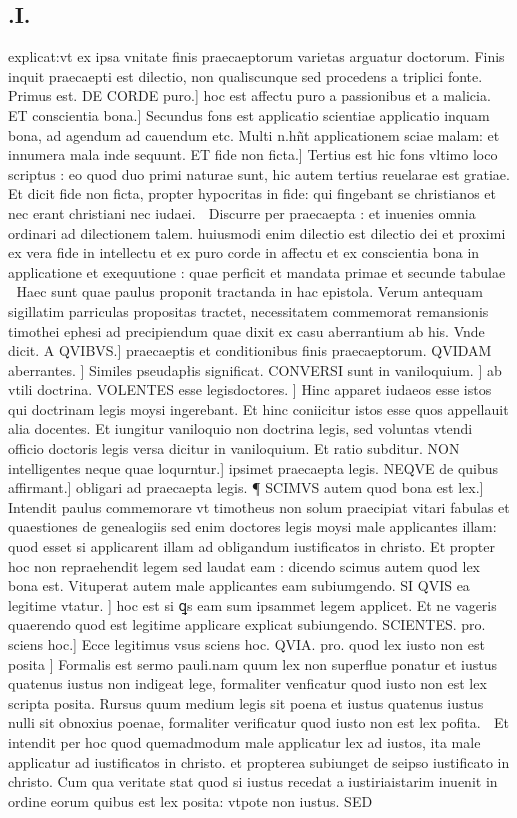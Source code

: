 \documentclass{article}
\begin{document}
\begin{pages}
\section*{.I. }\pstart explicat:vt ex ipsa vnitate finis praecaeptorum varietas arguatur doctorum. Finis inquit praecaepti est dilectio, non qualiscunque sed procedens a triplici fonte. Primus est. DE CORDE puro.] hoc est affectu puro a passionibus et a malicia. ET conscientia bona.] Secundus fons est applicatio scientiae applicatio inquam bona, ad agendum ad cauendum etc. Multi n.hñt applicationem sciae malam: et innumera mala inde sequunt. ET fide non ficta.] Tertius est hic fons vltimo loco scriptus : eo quod duo primi naturae sunt, hic autem tertius reuelarae est gratiae. Et dicit fide non ficta, propter hypocritas in fide: qui fingebant se christianos  et nec erant christiani nec iudaei.  Discurre per praecaepta : et inuenies omnia ordinari ad dilectionem talem. huiusmodi enim dilectio est dilectio dei et proximi ex vera fide in intellectu et ex puro corde in affectu et ex conscientia bona in applicatione et exequutione : quae perficit et mandata primae et secunde tabulae  Haec sunt quae paulus proponit tractanda in hac epistola. Verum antequam sigillatim parriculas propositas tractet, necessitatem commemorat remansionis timothei ephesi ad precipiendum quae dixit ex casu aberrantium ab his. Vnde dicit. A QVIBVS.] praecaeptis et conditionibus finis praecaeptorum. QVIDAM aberrantes. ] Similes pseudapłis significat. CONVERSI sunt in vaniloquium. ] ab vtili doctrina. VOLENTES esse legisdoctores. ] Hinc apparet iudaeos esse istos qui doctrinam legis moysi ingerebant. Et hinc coniicitur istos esse quos appellauit alia docentes. Et iungitur vaniloquio non doctrina legis, sed voluntas vtendi officio doctoris legis versa dicitur in vaniloquium. Et ratio subditur. NON intelligentes neque quae loqurntur.] ipsimet praecaepta legis. NEQVE de quibus affirmant.] obligari ad praecaepta legis.  \pend\pstart ¶ SCIMVS autem quod bona est lex.] Intendit paulus commemorare vt timotheus non solum praecipiat vitari fabulas et quaestiones de genealogiis sed enim doctores legis moysi male applicantes illam: quod esset si applicarent illam ad obligandum iustificatos in christo. Et propter hoc non repraehendit legem sed laudat eam : dicendo scimus autem quod lex bona est. Vituperat autem male applicantes eam subiumgendo. SI QVIS ea legitime vtatur. ] hoc est si ꝗs eam sum ipsammet legem applicet. Et ne vageris quaerendo quod est legitime applicare explicat subiungendo. SCIENTES. pro. sciens hoc.] Ecce legitimus vsus sciens hoc. QVIA. pro. quod lex iusto non est posita ] Formalis est sermo pauli.nam quum lex non superflue ponatur et iustus quatenus iustus non indigeat lege, formaliter venficatur quod iusto non est lex scripta posita. Rursus quum medium legis sit poena et iustus quatenus iustus nulli sit obnoxius poenae, formaliter verificatur quod iusto non est lex pofita.  Et intendit per hoc quod quemadmodum male applicatur lex ad iustos, ita male applicatur ad iustificatos in christo. et propterea subiunget de seipso iustificato in christo. Cum qua veritate stat quod si iustus recedat a iustiriaistarim inuenit in ordine eorum quibus est lex posita: vtpote non iustus. SED 
\end{pages}
\end{document}
